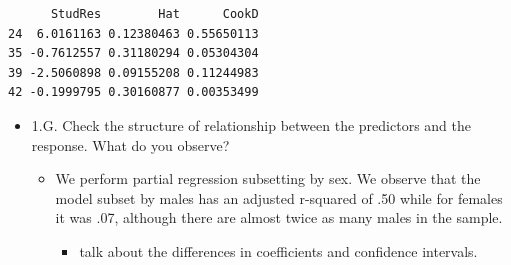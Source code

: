 \documentclass[
  letterpaper,
  DIV=11,
  numbers=noendperiod]{scrartcl}
\providecommand{\tightlist}{%
  \setlength{\itemsep}{0pt}\setlength{\parskip}{0pt}}\usepackage{longtable,booktabs,array}
\begin{document}

\begin{verbatim}
      StudRes        Hat      CookD
24  6.0161163 0.12380463 0.55650113
35 -0.7612557 0.31180294 0.05304304
39 -2.5060898 0.09155208 0.11244983
42 -0.1999795 0.30160877 0.00353499
\end{verbatim}

\begin{itemize}
\tightlist
\item
  1.G. Check the structure of relationship between the predictors and
  the response. What do you observe?

  \begin{itemize}
  \tightlist
  \item
    We perform partial regression subsetting by sex. We observe that the
    model subset by males has an adjusted r-squared of .50 while for
    females it was .07, although there are almost twice as many males in
    the sample.

    \begin{itemize}
    \tightlist
    \item
      talk about the differences in coefficients and confidence
      intervals.
    \end{itemize}
  \end{itemize}
\end{itemize}
\end{document}
